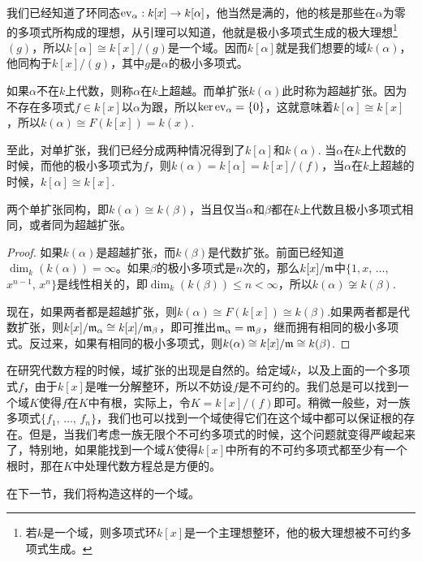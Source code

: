 我们已经知道了环同态$\operatorname{ev}_\alpha:k[x]\to k[\alpha]$，他当然是满的，他的核是那些在$\alpha$为零的多项式所构成的理想，从引理可以知道，他就是极小多项式生成的极大理想\footnote{若$k$是一个域，则多项式环$k[x]$是一个主理想整环，他的极大理想被不可约多项式生成。}$(g)$，所以$k[\alpha]\cong k[x]/(g)$是一个域。因而$k[\alpha]$就是我们想要的域$k(\alpha)$，他同构于$k[x]/(g)$，其中$g$是$\alpha$的极小多项式。

\para 如果$\alpha$不在$k$上代数，则称$\alpha$在$k$上超越。而单扩张$k(\alpha)$此时称为超越扩张。因为不存在多项式$f\in k[x]$以$\alpha$为跟，所以$\ker \operatorname{ev}_\alpha=\{0\}$，这就意味着$k[\alpha]\cong k[x]$，所以$k(\alpha)\cong F(k[x])=k(x)$.

至此，对单扩张，我们已经分成两种情况得到了$k[\alpha]$和$k(\alpha)$. 当$\alpha$在$k$上代数的时候，而他的极小多项式为$f$，则$k(\alpha)=k[\alpha]=k[x]/(f)$，当$\alpha$在$k$上超越的时候，$k[\alpha]\cong k[x]$.

\begin{pro}
两个单扩张同构，即$k(\alpha)\cong k(\beta)$，当且仅当$\alpha$和$\beta$都在$k$上代数且极小多项式相同，或者同为超越扩张。
\end{pro}

\begin{proof} 
	如果$k(\alpha)$是超越扩张，而$k(\beta)$是代数扩张。前面已经知道$\dim_k(k(\alpha))=\infty$。如果$\beta$的极小多项式是$n$次的，那么$k[x]/\mathfrak{m}$中$\{1,x$, $\dots$, $x^{n-1}$, $x^n\}$是线性相关的，即$\dim_k(k(\beta))\leq n<\infty$，所以$k(\alpha)\not\cong k(\beta)$.

	现在，如果两者都是超越扩张，则$k(\alpha)\cong F(k[x])\cong k(\beta)$.如果两者都是代数扩张，则$k[x]/\mathfrak{m}_\alpha\cong k[x]/\mathfrak{m}_\beta$，即可推出$\mathfrak{m}_\alpha=\mathfrak{m}_\beta$，继而拥有相同的极小多项式。反过来，如果有相同的极小多项式，则$k(\alpha)\cong k[x]/\mathfrak{m}\cong k(\beta)$.
\end{proof}

\begin{para}
	在研究代数方程的时候，域扩张的出现是自然的。给定域$k$，以及上面的一个多项式$f$，由于$k[x]$是唯一分解整环，所以不妨设$f$是不可约的。我们总是可以找到一个域$K$使得$f$在$K$中有根，实际上，令$K=k[x]/(f)$即可。稍微一般些，对一族多项式$\{f_1$, $\dots$, $f_n\}$，我们也可以找到一个域使得它们在这个域中都可以保证根的存在。但是，当我们考虑一族无限个不可约多项式的时候，这个问题就变得严峻起来了，特别地，如果能找到一个域$K$使得$k[x]$中所有的不可约多项式都至少有一个根时，那在$K$中处理代数方程总是方便的。
\end{para}

在下一节，我们将构造这样的一个域。

